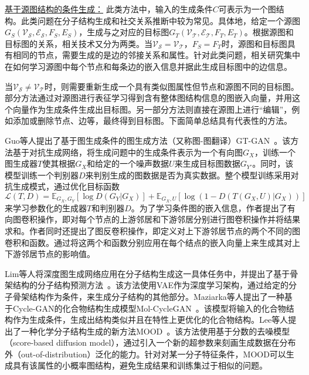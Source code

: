 \underline{基于源图结构的条件生成：} 此类方法中，输入的生成条件$C$可表示为一个图结构。此类问题在分子结构生成和社交关系推断中较为常见。具体地，给定一个源图$G_S(\mathcal{V_S}, \mathcal{E_S}, F_S, E_S)$，生成与之对应的目标图$G_T(\mathcal{V_T}, \mathcal{E_T}, F_T, E_T)$。根据源图和目标图的关系，相关技术又分为两类。当$\mathcal{V_S} = \mathcal{V_T}$，$F_S = F_T$时，源图和目标图具有相同的节点，需要生成的是边的邻接关系和属性。针对此类问题，相关研究集中在如何学习源图中每个节点和每条边的嵌入信息并据此生成目标图中的边信息。

当$\mathcal{V_S} \ne \mathcal{V_T}$时，则需要重新生成一个具有类似图属性但节点和源图不同的目标图。部分方法通过对源图进行表征学习得到含有整体图结构信息的图嵌入向量，并用这个向量作为生成条件生成出目标图。另一部分方法则直接在源图上进行``编辑''，例如添加或删除节点、边等，最终得到目标图。下面简单总结具有代表性的方法。

Guo等人提出了基于图生成条件的图生成方法（又称图-图翻译）GT-GAN~\cite{guo2022deep}。该方法基于对抗生成网络，将生成问题中的生成条件表示为一个有向图$G_X$，训练一个图生成器$T$使其根据$G_X$和给定的一个噪声数据$U$来生成目标图数据$G_{Y'}$。同时，该模型训练一个判别器$D$来判别生成的图数据是否为真实数据。整个模型训练采用对抗生成模式，通过优化目标函数$\mathcal{L}(T,D) = \mathbb{E}_{G_X, G_Y}[\log D(G_Y|G_X)]+\mathbb{E}_{G_X,U}[\log (1-D(T(G_X,U)|G_X))]$来学习参数化的生成器$T$和判别器$D$。为了学习条件图的嵌入信息，作者提出了有向图卷积操作，即对每个节点的上游邻居和下游邻居分别进行图卷积操作并将结果求和。作者同时还提出了图反卷积操作，即定义对上下游邻居节点的两个不同的图卷积和函数。通过将这两个和函数分别应用在每个结点的嵌入向量上来生成其对上下游邻居节点的影响值。

Lim等人将深度图生成网络应用在分子结构生成这一具体任务中，并提出了基于骨架结构的分子结构预测方法~\cite{lim2020scaffold}。该方法使用VAE作为深度学习架构，通过给定的分子骨架结构作为条件，来生成分子结构的其他部分。Maziarka等人提出了一种基于Cycle-GAN的化合物结构生成模型Mol-CycleGAN~\cite{maziarka2020mol}。该模型将输入的化合物结构作为生成条件，生成出结构类似并且在特性上更优化的化合物结构。Lee等人提出了一种化学分子结构生成的新方法MOOD~\cite{lee2023exploring}。该方法使用基于分数的去噪模型（score-based diffusion model），通过引入一个新的超参数来刻画生成数据在分布外（out-of-distribution）泛化的能力。针对对某一分子特征条件，MOOD可以生成具有该属性的小概率图结构，避免生成结果和训练集过于相似的问题。


